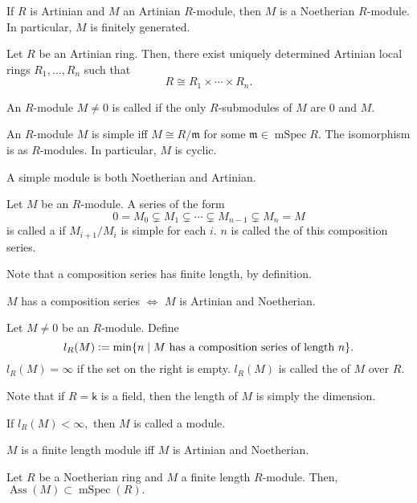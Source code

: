 \documentclass[12pt]{article}	%
\DeclareMathOperator{\Ass}{Ass}
\DeclareMathOperator{\mSpec}{mSpec}
\begin{document}
\begin{prop}
	If $R$ is Artinian and $M$ an Artinian $R$-module, then $M$ is a Noetherian $R$-module. In particular, $M$ is finitely generated.
\end{prop}

\begin{thm}
	Let $R$ be an Artinian ring. Then, there exist uniquely determined Artinian local rings $R_1, \ldots, R_n$ such that
	\begin{equation*} 
		R \cong R_1 \times \cdots \times R_n.
	\end{equation*}
\end{thm}

\begin{defn}%
	An $R$-module $M \neq 0$ is called  if the only $R$-submodules of $M$ are $0$ and $M.$
\end{defn}
\begin{prop}
	An $R$-module $M$ is simple iff $M \cong R/\mathfrak{m}$ for some $\mathfrak{m} \in \mSpec R.$ The isomorphism is as $R$-modules. In particular, $M$ is cyclic.
\end{prop}
\begin{lem} 
	A simple module is both Noetherian and Artinian.
\end{lem}

\begin{defn}%
	Let $M$ be an $R$-module. A series of the form
	\begin{equation*} 
		0 = M_0 \subsetneq M_1 \subsetneq \cdots \subsetneq M_{n-1} \subsetneq M_n = M
	\end{equation*}
	is called a  if $M_{i + 1}/M_i$ is simple for each $i.$ $n$ is called the  of this composition series.
\end{defn}
Note that a composition series has finite length, by definition.

\begin{thm}
	$M$ has a composition series $\iff$ $M$ is Artinian and Noetherian.
\end{thm}

\begin{defn}
	Let $M \neq 0$ be an $R$-module. Define
	\begin{equation*} 
		l_R(M) \vcentcolon= \min \{n \mid M \text{ has a composition series of length }n\}.
	\end{equation*}
	$l_R(M) = \infty$ if the set on the right is empty. $l_R(M)$ is called the  of $M$ over $R.$
\end{defn}
Note that if $R = \mathsf{k}$ is a field, then the length of $M$ is simply the dimension.
\begin{defn}%
	If $l_R(M) < \infty,$ then $M$ is called a  module.
\end{defn}
\begin{prop}
	$M$ is a finite length module iff $M$ is Artinian and Noetherian.
\end{prop}
\begin{prop}
	Let $R$ be a Noetherian ring and $M$ a finite length $R$-module. Then, $\Ass(M) \subset \mSpec(R).$
\end{prop}
\end{document}
